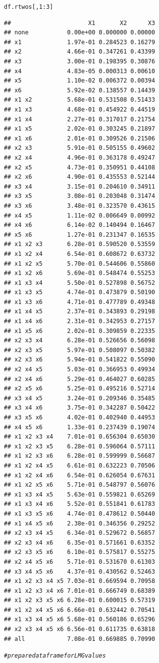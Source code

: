 \documentclass[11pt,a4paper,twoside]{book}\usepackage[]{graphicx}\usepackage[]{color}
\makeatletter
\newcommand{\hlnum}[1]{\textcolor[rgb]{0.686,0.059,0.569}{#1}}%
\newcommand{\hlcom}[1]{\textcolor[rgb]{0.678,0.584,0.686}{\textit{#1}}}%
\newcommand{\hlopt}[1]{\textcolor[rgb]{0,0,0}{#1}}%
\newcommand{\hlstd}[1]{\textcolor[rgb]{0.345,0.345,0.345}{#1}}%
\newenvironment{kframe}{%
 \def\at@end@of@kframe{}%
 \ifinner\ifhmode%
  \def\at@end@of@kframe{\end{minipage}}%
  \begin{minipage}{\columnwidth}%
 \fi\fi%
 \def\FrameCommand##1{\hskip\@totalleftmargin \hskip-\fboxsep
 \colorbox{shadecolor}{##1}\hskip-\fboxsep
     \hskip-\linewidth \hskip-\@totalleftmargin \hskip\columnwidth}%
 \MakeFramed {\advance\hsize-\width
   \@totalleftmargin\z@ \linewidth\hsize
   \@setminipage}}%
 {\par\unskip\endMakeFramed%
 \at@end@of@kframe}
\newenvironment{knitrout}{}{} %
\makeatother
\begin{document}
\begin{knitrout}
\begin{kframe}
\begin{alltt}
\hlstd{df.rtwos[,}\hlnum{1}\hlopt{:}\hlnum{3}\hlstd{]}
\end{alltt}
\begin{verbatim}
##                      X1       X2      X3
## none           0.00e+00 0.000000 0.00000
## x1             1.97e-01 0.284523 0.16279
## x2             4.66e-01 0.347261 0.43399
## x3             3.00e-01 0.198395 0.30876
## x4             4.83e-05 0.000313 0.00610
## x5             1.10e-02 0.006372 0.00394
## x6             5.92e-02 0.138557 0.14439
## x1 x2          5.68e-01 0.531508 0.51433
## x1 x3          4.68e-01 0.454922 0.44519
## x1 x4          2.27e-01 0.317017 0.21754
## x1 x5          2.02e-01 0.303245 0.21897
## x1 x6          2.01e-01 0.309526 0.21506
## x2 x3          5.91e-01 0.505155 0.49602
## x2 x4          4.96e-01 0.363178 0.49247
## x2 x5          4.73e-01 0.350951 0.44108
## x2 x6          4.90e-01 0.435553 0.52144
## x3 x4          3.15e-01 0.204610 0.34911
## x3 x5          3.08e-01 0.203048 0.31474
## x3 x6          3.48e-01 0.323570 0.43615
## x4 x5          1.11e-02 0.006649 0.00992
## x4 x6          6.14e-02 0.140494 0.16467
## x5 x6          1.27e-01 0.231347 0.16535
## x1 x2 x3       6.28e-01 0.590520 0.53559
## x1 x2 x4       6.54e-01 0.608672 0.63732
## x1 x2 x5       5.70e-01 0.544606 0.55860
## x1 x2 x6       5.69e-01 0.548474 0.55253
## x1 x3 x4       5.50e-01 0.527898 0.56752
## x1 x3 x5       4.74e-01 0.473879 0.50190
## x1 x3 x6       4.71e-01 0.477789 0.49348
## x1 x4 x5       2.37e-01 0.343893 0.29198
## x1 x4 x6       2.31e-01 0.342953 0.27157
## x1 x5 x6       2.02e-01 0.309859 0.22335
## x2 x3 x4       6.28e-01 0.526656 0.56098
## x2 x3 x5       5.97e-01 0.508097 0.50382
## x2 x3 x6       5.94e-01 0.541822 0.55090
## x2 x4 x5       5.03e-01 0.366953 0.49934
## x2 x4 x6       5.29e-01 0.464027 0.60285
## x2 x5 x6       5.25e-01 0.495216 0.52714
## x3 x4 x5       3.24e-01 0.209346 0.35485
## x3 x4 x6       3.75e-01 0.342287 0.50422
## x3 x5 x6       4.02e-01 0.402940 0.44953
## x4 x5 x6       1.33e-01 0.237439 0.19074
## x1 x2 x3 x4    7.01e-01 0.656304 0.65030
## x1 x2 x3 x5    6.28e-01 0.596064 0.57111
## x1 x2 x3 x6    6.28e-01 0.599999 0.56687
## x1 x2 x4 x5    6.61e-01 0.632223 0.70506
## x1 x2 x4 x6    6.54e-01 0.626054 0.67631
## x1 x2 x5 x6    5.71e-01 0.548797 0.56076
## x1 x3 x4 x5    5.63e-01 0.559821 0.65269
## x1 x3 x4 x6    5.52e-01 0.551841 0.61783
## x1 x3 x5 x6    4.74e-01 0.478612 0.50440
## x1 x4 x5 x6    2.38e-01 0.346356 0.29252
## x2 x3 x4 x5    6.34e-01 0.529672 0.56857
## x2 x3 x4 x6    6.35e-01 0.571661 0.63352
## x2 x3 x5 x6    6.10e-01 0.575817 0.55275
## x2 x4 x5 x6    5.71e-01 0.531670 0.61303
## x3 x4 x5 x6    4.37e-01 0.430562 0.52463
## x1 x2 x3 x4 x5 7.03e-01 0.669594 0.70958
## x1 x2 x3 x4 x6 7.01e-01 0.666749 0.68389
## x1 x2 x3 x5 x6 6.28e-01 0.600015 0.57319
## x1 x2 x4 x5 x6 6.66e-01 0.632442 0.70541
## x1 x3 x4 x5 x6 5.68e-01 0.560186 0.65296
## x2 x3 x4 x5 x6 6.56e-01 0.611735 0.63818
## all            7.08e-01 0.669885 0.70990
\end{verbatim}
\begin{alltt}
\hlcom{# prepare data frame for LMG values}


\end{alltt}
\end{kframe}
\end{knitrout}
\end{document}
